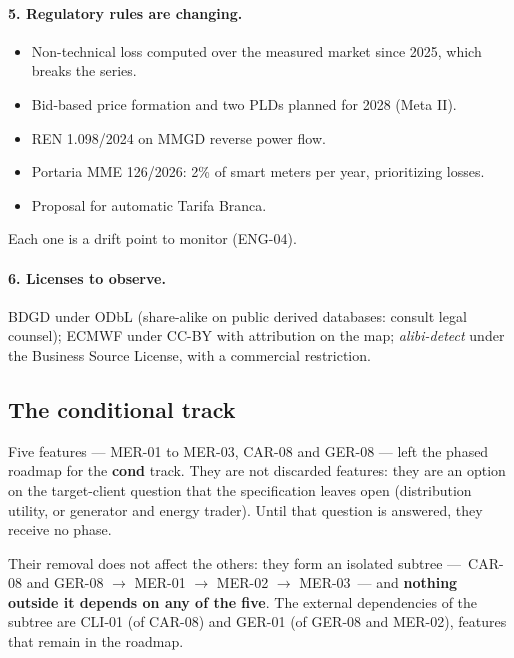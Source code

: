 \paragraph{5. Regulatory rules are changing.}
\begin{itemize}
  \item Non-technical loss computed over the measured market since 2025,
    which breaks the series.
  \item Bid-based price formation and two PLDs planned for 2028 (Meta II).
  \item REN 1.098/2024 on MMGD reverse power flow.
  \item Portaria MME 126/2026: 2\% of smart meters per year, prioritizing
    losses.
  \item Proposal for automatic Tarifa Branca.
\end{itemize}
Each one is a drift point to monitor (ENG-04).

\paragraph{6. Licenses to observe.} BDGD under ODbL (share-alike on public
derived databases: consult legal counsel); ECMWF under CC-BY with attribution
on the map; \emph{alibi-detect} under the Business Source License, with a
commercial restriction.

\subsection*{The conditional track}

Five features --- MER-01 to MER-03, CAR-08 and GER-08 --- left the phased
roadmap for the \textbf{cond} track. They are not discarded features: they
are an option on the target-client question that the specification leaves
open (distribution utility, or generator and energy trader). Until that
question is answered, they receive no phase.

Their removal does not affect the others: they form an isolated subtree
---~CAR-08 and GER-08 $\rightarrow$ MER-01 $\rightarrow$ MER-02 $\rightarrow$
MER-03~--- and \textbf{nothing outside it depends on any of the five}. The
external dependencies of the subtree are CLI-01 (of CAR-08) and GER-01 (of
GER-08 and MER-02), features that remain in the roadmap.

